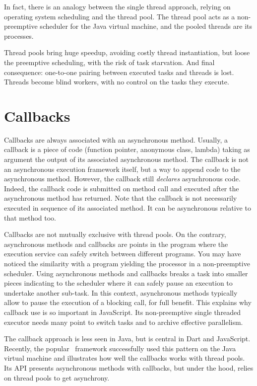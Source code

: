 In fact, there is an analogy between the single thread approach, relying on operating system scheduling and the thread pool. The thread pool acts as a non-preemptive scheduler for the Java virtual machine, and the pooled threads are its processes.

Thread pools bring huge speedup, avoiding costly thread instantiation, but loose the preemptive scheduling, with the risk of task starvation.
And final consequence: one-to-one pairing between executed tasks and threads is lost. Threads become blind workers, with no control on the tasks they execute.

\section{Callbacks}

Callbacks are always associated with an asynchronous method. Usually, a callback is a piece of code (function pointer, anonymous class, lambda) taking as argument the output of its associated asynchronous method. The callback is not an asynchronous execution framework itself, but a way to append code to the asynchronous method. However, the callback still \emph{declares} asynchronous code. Indeed, the callback code is submitted on method call and executed after the asynchronous method has returned. Note that the callback is not necessarily executed in sequence of its associated method. It can be asynchronous relative to that method too.

Callbacks are not mutually exclusive with thread pools. On the contrary, asynchronous methods and callbacks are points in the program where the execution service can safely switch between different programs. You may have noticed the similarity with a program yielding the processor in a non-preemptive scheduler. Using asynchronous methods and callbacks breaks a task into smaller pieces indicating to the scheduler where it can safely pause an execution to undertake another sub-task. In this context, asynchronous methods typically allow to pause the execution of a blocking call, for full benefit. This explains why callback use is so important in JavaScript. Its non-preemptive single threaded executor needs many point to switch tasks and to archive effective parallelism.

The callback approach is less seen in Java, but is central in Dart and JavaScript. Recently, the popular \vertx\ framework successfully used this pattern on the Java virtual machine and illustrates how well the callbacks works with thread pools. Its API presents asynchronous methods with callbacks, but under the hood, relies on thread pools to get asynchrony.

